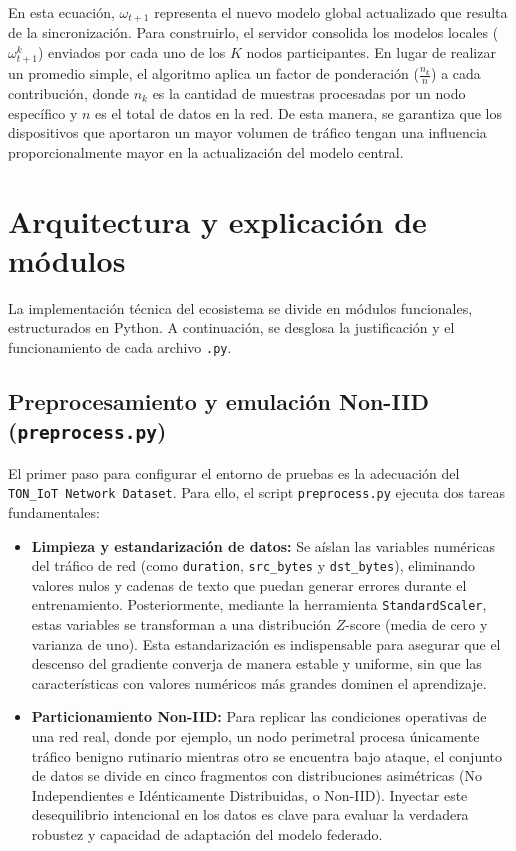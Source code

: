 \documentclass[12pt,a4paper]{article}
\begin{document}
En esta ecuación, $\omega_{t+1}$ representa el nuevo modelo global actualizado que resulta de la sincronización. Para construirlo, el servidor consolida los modelos locales ($\omega_{t+1}^k$) enviados por cada uno de los $K$ nodos participantes. En lugar de realizar un promedio simple, el algoritmo aplica un factor de ponderación ($\frac{n_k}{n}$) a cada contribución, donde $n_k$ es la cantidad de muestras procesadas por un nodo específico y $n$ es el total de datos en la red. De esta manera, se garantiza que los dispositivos que aportaron un mayor volumen de tráfico tengan una influencia proporcionalmente mayor en la actualización del modelo central.


\section{Arquitectura y explicación de módulos}
La implementación técnica del ecosistema se divide en módulos funcionales, estructurados en Python. A continuación, se desglosa la justificación y el funcionamiento de cada archivo \texttt{.py}.

\subsection{Preprocesamiento y emulación Non-IID (\texttt{preprocess.py})}
El primer paso para configurar el entorno de pruebas es la adecuación del \texttt{TON\_IoT Network Dataset}. Para ello, el script \texttt{preprocess.py} ejecuta dos tareas fundamentales:

\begin{itemize}
\item \textbf{Limpieza y estandarización de datos:} Se aíslan las variables numéricas del tráfico de red (como \texttt{duration}, \texttt{src\_bytes} y \texttt{dst\_bytes}), eliminando valores nulos y cadenas de texto que puedan generar errores durante el entrenamiento. Posteriormente, mediante la herramienta \texttt{StandardScaler}, estas variables se transforman a una distribución $Z$-score (media de cero y varianza de uno). Esta estandarización es indispensable para asegurar que el descenso del gradiente converja de manera estable y uniforme, sin que las características con valores numéricos más grandes dominen el aprendizaje.

\item \textbf{Particionamiento Non-IID:} Para replicar las condiciones operativas de una red real, donde por ejemplo, un nodo perimetral procesa únicamente tráfico benigno rutinario mientras otro se encuentra bajo ataque, el conjunto de datos se divide en cinco fragmentos con distribuciones asimétricas (No Independientes e Idénticamente Distribuidas, o Non-IID). Inyectar este desequilibrio intencional en los datos es clave para evaluar la verdadera robustez y capacidad de adaptación del modelo federado.
\end{itemize}
\end{document}
